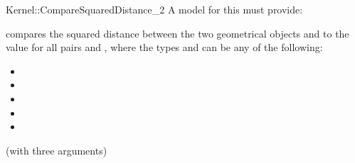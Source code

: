 \begin{ccRefFunctionObjectConcept}{Kernel::CompareSquaredDistance_2}
A model for this must provide:


      {compares the squared distance between the two geometrical objects
         and  to the value }
for all pairs  and , where
the types  and  can be any of the
following:
\begin{itemize}
\item {}
\item {}
\item {}
\item {}
\item {}
\end{itemize}


\ccRefines
{} (with three arguments)

\ccSeeAlso

 \\
 \\

\end{ccRefFunctionObjectConcept}
